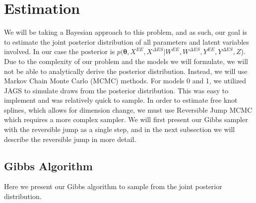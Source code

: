 \documentclass[11pt]{article}\usepackage[]{graphicx}\usepackage[]{color}
\begin{document}
\section{Estimation}

We will be taking a Bayesian approach to this problem, and as such, our goal is to estimate the joint  posterior distribution of all parameters and latent variables involved. In our case the posterior is  $p(\boldsymbol{\theta}, X^{EE},X^{\Delta ES}|W^{EE},W^{\Delta ES},Y^{EE},Y^{\Delta ES},Z$). Due to the complexity of our problem and the models we will formulate, we will not be able to analytically derive the posterior distribution. Instead, we will use Markov Chain Monte Carlo (MCMC) methods. For models 0 and 1, we utilized JAGS to simulate draws from the posterior distribution. This was easy to implement and was relatively quick to sample. In order to estimate free knot splines, which allows for dimension change, we must use Reversible Jump MCMC which requires a more complex sampler. We will first present our Gibbs sampler with the reversible jump as a single step, and in the next subsection we will describe the reversible jump in more detail.

\subsection{Gibbs Algorithm}
Here we present our Gibbs algorithm to sample from the joint posterior distribution.
\end{document}
